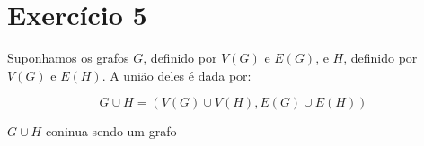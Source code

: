 \section{Exercício 5} 

Suponhamos os grafos $G$, definido por $V(G)$ e $E(G)$, e $H$, definido por $V(G)$ e $E(H)$. A união deles é dada por:

\begin{equation}
	G \cup H = ( V(G) \cup V(H), E(G) \cup E(H) )
\end{equation}


$G \cup H$ coninua sendo um grafo

